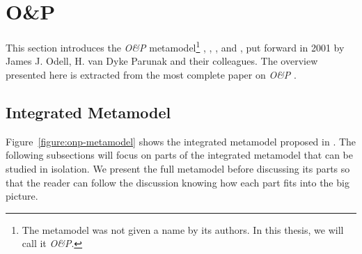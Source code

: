 
\section{O\&P}

This section introduces the \textit{O\&P} metamodel\footnote{The metamodel was not given a name by its authors. In this thesis, we will call it \textit{O\&P}.} \cite{Odell01}, \cite{Parunak02}, \cite{Odell03b}, \cite{Odell04b} and \cite{Odell05}, put forward in 2001 by James J. Odell, H. van Dyke Parunak and their colleagues.
The overview presented here is extracted from the most complete paper on \textit{O\&P} \cite{Odell05}.


\subsection{Integrated Metamodel}

Figure~\ref{figure:onp-metamodel} shows the integrated metamodel proposed in \cite{Odell05}.
The following subsections will focus on parts of the integrated metamodel that can be studied in isolation.
We present the full metamodel before discussing its parts so that the reader can follow the discussion knowing how each part fits into the big picture.

